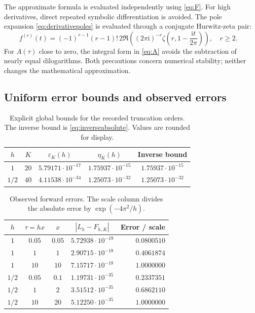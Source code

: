 \documentclass[11pt,a4paper]{article}
\numberwithin{equation}{section}
\theoremstyle{definition}
\newcommand{\ii}{\mathrm i}
\newcommand{\eps}{\varepsilon}
\begin{document}
The approximate formula is evaluated independently using \eqref{eq:F}. For high derivatives, direct repeated symbolic differentiation is avoided. The pole expansion \eqref{eq:derivativepoles} is evaluated through a conjugate Hurwitz-zeta pair:
\begin{equation}
f^{(r)}(t)=(-1)^{r-1}(r-1)!
\,2\Re\left((2\pi\ii)^{-r}
               \zeta\left(r,1-\frac{\ii t}{2\pi}\right)\right),\quad r\ge2.
\label{eq:Hurwitzderivative}
\end{equation}
For $A(\tau)$ close to zero, the integral form in \eqref{eq:A} avoids the subtraction of nearly equal dilogarithms. Both precautions concern numerical stability; neither changes the mathematical approximation.

\subsection{Uniform error bounds and observed errors}
\begin{table}[htbp]
\centering\small
\caption{Explicit global bounds for the recorded truncation orders. The inverse bound is \eqref{eq:inverseabsolute}. Values are rounded for display.}
\label{tab:bounds}
\begin{tabular}{@{}ccccc@{}}\toprule
$h$&$K$&$\eps_K(h)$&$\eta_K(h)$&Inverse bound\\\midrule
$1$&$20$&$5.79171\cdot10^{-17}$&$1.75937\cdot10^{-15}$&$1.75937\cdot10^{-15}$\\
$1/2$&$40$&$4.11538\cdot10^{-34}$&$1.25073\cdot10^{-32}$&$1.25073\cdot10^{-32}$\\\bottomrule
\end{tabular}
\end{table}

\begin{table}[htbp]
\centering\small
\caption{Observed forward errors. The scale column divides the absolute error by $\exp(-4\pi^2/h)$.}
\label{tab:forward}
\begin{tabular}{@{}ccccr@{}}\toprule
$h$&$\tau=hx$&$x$&$|L_h-F_{h,K}|$&Error / scale\\\midrule
$1$&$0.05$&$0.05$&$5.72938\cdot10^{-19}$&$0.0800510$\\
$1$&$1$&$1$&$2.90715\cdot10^{-18}$&$0.4061874$\\
$1$&$10$&$10$&$7.15717\cdot10^{-18}$&$1.0000000$\\
$1/2$&$0.05$&$0.1$&$1.19731\cdot10^{-35}$&$0.2337351$\\
$1/2$&$1$&$2$&$3.51512\cdot10^{-35}$&$0.6862110$\\
$1/2$&$10$&$20$&$5.12250\cdot10^{-35}$&$1.0000000$\\\bottomrule
\end{tabular}
\end{table}
\end{document}
